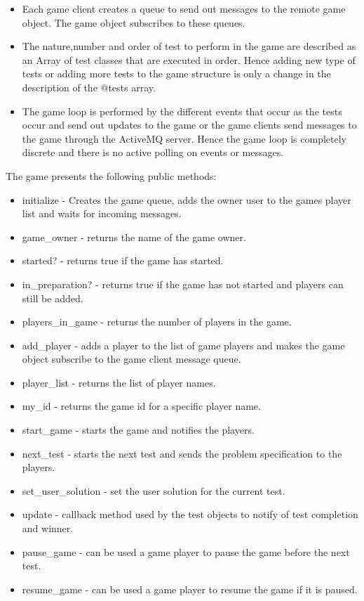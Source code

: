 \documentclass[a4paper,10pt,titlepage]{article}
\begin{document}
\begin{description}
\begin{itemize}
		\item Each game client creates a queue to send out messages to the remote game object. The game object subscribes to these queues.
		\item The nature,number and order of test to perform in the game are described as an Array of test classes that are executed in order. Hence adding new type of tests or adding more tests to the game structure is only a change in the description of the @tests array. 
		\item The game loop is performed by the different events that occur as the tests occur and send out updates to the game or the game clients send messages to the game through the ActiveMQ server. Hence the game loop is completely discrete and there is no active polling on events or messages. 
	\end{itemize}
	The game presents the following public methods:
	\begin{itemize}
		\item initialize - Creates the game queue, adds the owner user to the games player list and waits for incoming messages.
		\item game\_owner - returns the name of the game owner.
		\item started? - returns true if the game has started.
		\item in\_preparation? - returns true if the game has not started and players can still be added.
		\item players\_in\_game - returns the number of players in the game.
		\item add\_player - adds a player to the list of game players and makes the game object subscribe to the game client message queue.
		\item player\_list - returns the list of player names.
		\item my\_id - returns the game id for a specific player name.
		\item start\_game - starts the game and notifies the players.
		\item next\_test - starts the next test and sends the problem specification to the players.
		\item set\_user\_solution - set the user solution for the current test.
		\item update - callback method used by the test objects to notify of test completion and winner.
		\item pause\_game - can be used a game player to pause the game before the next test.
		\item resume\_game - can be used a game player to resume the game if it is paused.

\end{itemize}
\end{description}
\end{document}
